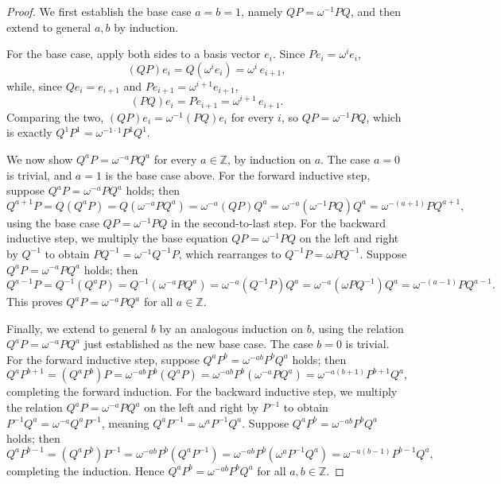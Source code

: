 \begin{proof}
    We first establish the base case
    \( a=b=1 \), namely \( QP = \omega^{-1}PQ \), and then extend
    to general \( a, b \) by induction.

    For the base case, apply both sides to a basis vector \( e_i \).
    Since \( Pe_i = \omega^i e_i \),
    \[
        (QP)e_i = Q(\omega^i e_i) = \omega^i\, e_{i+1},
    \]
    while, since \( Qe_i = e_{i+1} \) and \( Pe_{i+1} = \omega^{i+1}e_{i+1} \),
    \[
        (PQ)e_i = P e_{i+1} = \omega^{i+1}\, e_{i+1}.
    \]
    Comparing the two, \( (QP)e_i = \omega^{-1}(PQ)e_i \) for every
    \( i \), so \( QP = \omega^{-1} PQ \), which is exactly
    \( Q^1P^1 = \omega^{-1\cdot 1} P^1Q^1 \).

    We now show \( Q^aP = \omega^{-a}PQ^a \) for every
    \( a \in \mathbb{Z} \), by induction on \( a \). The case \( a=0 \)
    is trivial, and \( a=1 \) is the base case above. For the forward
    inductive step, suppose \( Q^aP = \omega^{-a}PQ^a \) holds; then
    \[
        Q^{a+1}P = Q(Q^aP) = Q(\omega^{-a}PQ^a) = \omega^{-a}(QP)Q^a
        = \omega^{-a}(\omega^{-1}PQ)Q^a = \omega^{-(a+1)}PQ^{a+1},
    \]
    using the base case \( QP=\omega^{-1}PQ \) in the second-to-last
    step. For the backward inductive step, we multiply the base equation
    \( QP = \omega^{-1}PQ \) on the left and right by \( Q^{-1} \) to obtain
    \( P Q^{-1} = \omega^{-1} Q^{-1} P \), which rearranges to
    \( Q^{-1}P = \omega PQ^{-1} \). Suppose \( Q^aP = \omega^{-a}PQ^a
    \) holds; then
    \[
        Q^{a-1}P = Q^{-1}(Q^aP) = Q^{-1}(\omega^{-a}PQ^a) =
        \omega^{-a}(Q^{-1}P)Q^a
        = \omega^{-a}(\omega PQ^{-1})Q^a = \omega^{-(a-1)}PQ^{a-1}.
    \]
    This proves \( Q^aP = \omega^{-a}PQ^a \) for all \( a \in \mathbb{Z} \).

    Finally, we extend to general \( b \) by an analogous induction
    on \( b \), using the relation \( Q^aP = \omega^{-a}PQ^a \) just
    established as the new base case. The case \( b=0 \) is
    trivial. For the forward inductive step, suppose
    \( Q^aP^b = \omega^{-ab}P^b Q^a \) holds; then
    \[
        Q^aP^{b+1} = (Q^aP^b)P = \omega^{-ab}P^b(Q^aP)
        = \omega^{-ab}P^b(\omega^{-a}PQ^a)
        = \omega^{-a(b+1)}P^{b+1}Q^a,
    \]
    completing the forward induction. For the backward inductive step,
    we multiply the relation \( Q^aP = \omega^{-a}PQ^a \) on the left and right
    by \( P^{-1} \) to obtain \( P^{-1}Q^a = \omega^{-a}Q^aP^{-1} \), meaning
    \( Q^aP^{-1} = \omega^a P^{-1}Q^a \). Suppose \( Q^aP^b =
    \omega^{-ab}P^b Q^a \) holds; then
    \[
        Q^aP^{b-1} = (Q^aP^b)P^{-1} = \omega^{-ab}P^b(Q^aP^{-1})
        = \omega^{-ab}P^b(\omega^a P^{-1}Q^a)
        = \omega^{-a(b-1)}P^{b-1}Q^a,
    \]
    completing the induction. Hence \( Q^aP^b = \omega^{-ab}P^b Q^a
    \) for all \( a,b \in \mathbb{Z} \).
\end{proof}


